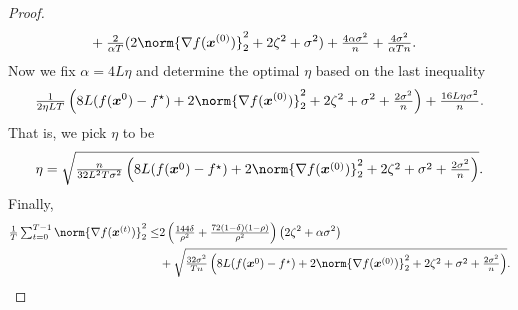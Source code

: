 \documentclass{article}
\begin{document}
\begin{proof}
\begin{align*}
        & + \tfrac{2}{\alpha T}(2\norm{\nabla f(\xx^{(0)}) }_2^2
    + 2 \zeta^2 + \sigma^2)
    + \tfrac{4\alpha\sigma^2}{n} + \tfrac{4\sigma^2}{ \alpha  T n}.
  \end{align*}
  Now we fix $\alpha=4L\eta$ and determine the optimal $\eta$ based on the last inequality
  \begin{align*}
    \tfrac{1}{2 \eta L T} \left( 8L(f(\xx^{0}) - f^\star) + 2\norm{\nabla f(\xx^{(0)}) }_2^2 + 2 \zeta^2 + \sigma^2 +\tfrac{2\sigma^2}{n} \right)
    + \tfrac{16L\eta\sigma^2}{n}.
  \end{align*}
  That is, we pick $\eta$ to be
  \begin{align*}
    \eta = \sqrt{\tfrac{n}{32 L^2 T \sigma^2} \left( 8L(f(\xx^{0}) - f^\star) + 2\norm{\nabla f(\xx^{(0)}) }_2^2 + 2 \zeta^2 + \sigma^2 +\tfrac{2\sigma^2}{n} \right)}.
  \end{align*}
  Finally,
  \begin{align*}
    \tfrac{1}{T}\tsum_{t=0}^{T-1} \norm{\nabla f(\xx^{(t)})}_2^2
    \le & {2\left( \tfrac{144\delta}{\rho^2} +\tfrac{72(1-\delta)(1-\rho)}{\rho^2}\right) \left( 2  \zeta^2 + \alpha\sigma^2 \right)}                               \\
        & + \sqrt{\tfrac{32\sigma^2}{T n} \left( 8L(f(\xx^{0}) - f^\star) + 2\norm{\nabla f(\xx^{(0)}) }_2^2 + 2 \zeta^2 + \sigma^2 +\tfrac{2\sigma^2}{n} \right)}.
  \end{align*}
\end{proof}
\end{document}
